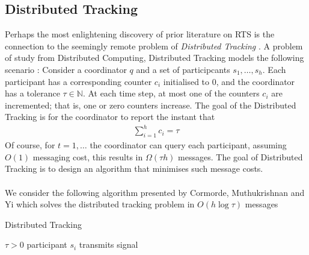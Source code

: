 \subsection{Distributed Tracking}

Perhaps the most enlightening discovery of prior literature on RTS is the connection to the seemingly remote problem of \textit{Distributed Tracking} \cite{Gan}. A problem of study from Distributed Computing, Distributed Tracking models the following scenario \cite{Cormode}: Consider a coordinator $q$ and a set of participcants $s_1, \dots, s_h$. Each participant has a corresponding counter $c_i$ initialised to 0, and the coordinator has a tolerance $\tau\in\mathbb{N}$. At each time step, at most one of the counters $c_i$ are incremented; that is, one or zero counters increase.  The goal of the Distributed Tracking is for the coordinator to report the instant that 
\begin{align}
    \sum_{i=1}^{h}c_i = \tau
\end{align}
Of course, for $t=1,\dots$ the coordinator can query each participant, assuming $O(1)$ messaging cost, this results in  $\Omega(\tau h)$ messages. The goal of Distributed Tracking is to design an algorithm that minimises such message costs. \\
\\
We consider the following algorithm presented by Cormorde, Muthukrishnan and Yi \cite{Cormode} which solves the distributed tracking problem in $O(h\log \tau)$ messages

\begin{algorithm}
\caption{Distributed Tracking }\label{Algorithm 1}
\begin{algorithmic}
\Require $\tau > 0$
    \State {}
    \State {} 
    \State {}
     
            \State participant $s_i$ transmits signal
        \EndIf
    \EndFor
\EndIf
\end{algorithmic}
\end{algorithm}



